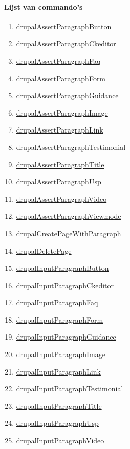 \paragraph{Lijst van commando's}
\begin{enumerate}
\item \hyperref[commando1]{drupalAssertParagraphButton}
\item \hyperref[commando2]{drupalAssertParagraphCkeditor}
\item \hyperref[commando3]{drupalAssertParagraphFaq}
\item \hyperref[commando4]{drupalAssertParagraphForm}
\item \hyperref[commando5]{drupalAssertParagraphGuidance}
\item \hyperref[commando6]{drupalAssertParagraphImage}
\item \hyperref[commando7]{drupalAssertParagraphLink}
\item \hyperref[commando8]{drupalAssertParagraphTestimonial}
\item \hyperref[commando9]{drupalAssertParagraphTitle}
\item \hyperref[commando10]{drupalAssertParagraphUsp}
\item \hyperref[commando11]{drupalAssertParagraphVideo}
\item \hyperref[commando12]{drupalAssertParagraphViewmode}
\item \hyperref[commando13]{drupalCreatePageWithParagraph}
\item \hyperref[commando14]{drupalDeletePage}
\item \hyperref[commando15]{drupalInputParagraphButton}
\item \hyperref[commando16]{drupalInputParagraphCkeditor}
\item \hyperref[commando17]{drupalInputParagraphFaq}
\item \hyperref[commando18]{drupalInputParagraphForm}
\item \hyperref[commando19]{drupalInputParagraphGuidance}
\item \hyperref[commando20]{drupalInputParagraphImage}
\item \hyperref[commando21]{drupalInputParagraphLink}
\item \hyperref[commando22]{drupalInputParagraphTestimonial}
\item \hyperref[commando23]{drupalInputParagraphTitle}
\item \hyperref[commando24]{drupalInputParagraphUsp}
\item \hyperref[commando25]{drupalInputParagraphVideo}

\end{enumerate}
